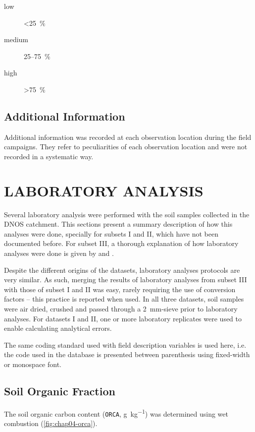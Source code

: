 \begin{description}
\item[low] \SI{<25}{\percent}
\item[medium] 25--\SI{75}{\percent}
\item[high] \SI{>75}{\percent}
\end{description}

\subsection{Additional Information}

Additional information was recorded at each observation location during the field campaigns. They refer to 
peculiarities of each observation location and were not recorded in a systematic way.

\section{LABORATORY ANALYSIS}
\label{sec:chap04-laboratory}

Several laboratory analysis were performed with the soil samples collected in the DNOS catchment. This 
sections present a summary description of how this analyses were done, specially for subsets I and II, which 
have not been documented before. For subset III, a thorough explanation of how laboratory analyses were done 
is given by \citet{Pedron2005} and \citet{Miguel2010}.

Despite the different origins of the datasets, laboratory analyses protocols are very similar. As such, 
merging the results of laboratory analyses from subset III with those of subset I and II was easy, rarely 
requiring the use of conversion factors -- this practice is reported when used. In all three datasets, soil 
samples were air dried, crushed and passed through a \SI{2}{\milli\metre}-sieve prior to laboratory analyses. 
For datasets I and II, one or more laboratory replicates were used to enable calculating analytical errors.

The same coding standard used with field description variables is used here, i.e. the code used in the 
database is presented between parenthesis using fixed-width or monospace font.

\subsection{Soil Organic Fraction}
\label{sec:chap04-organic}

The soil organic carbon content (\texttt{ORCA}, \si{\gram\per\kilo\gram}) was determined using wet combustion 
\cite{YeomansEtAl1988, Mebius1960, TedescoEtAl1995, ClaessenEtAl1997} (\autoref{fig:chap04-orca}).

